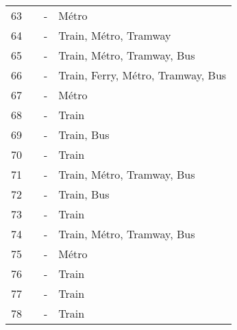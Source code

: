 \begin{longtable}{p{0.5cm}p{5.5cm}p{3cm}p{4cm}}
    \small{63} & \small{\textcite{luan_better_2020}}\index{Luan, Xin|pagebf} & \small{-} & \small{Métro}\\
    \small{64} & \small{\textcite{marques_potential_2017}}\index{Marques, R.|pagebf} & \small{-} & \small{Train, Métro, Tramway}\\
    \small{65} & \small{\textcite{martens_bicycle_2004}}\index{Martens, Karel|pagebf} & \small{-} & \small{Train, Métro, Tramway, Bus}\\
    \small{66} & \small{\textcite{martens_promoting_2007}}\index{Martens, Karel|pagebf} & \small{-} & \small{Train, Ferry, Métro, Tramway, Bus}\\
    \small{67} & \small{\textcite{meng_influence_2016}}\index{Meng, Meng|pagebf} & \small{-} & \small{Métro}\\
    \small{68} & \small{\textcite{midenet_modal_2018}}\index{Midenet, Sophie|pagebf} & \small{-} & \small{Train}\\
    \small{69} & \small{\textcite{mohanty_effect_2017}}\index{Mohanty, Sudatta|pagebf} & \small{-} & \small{Train, Bus}\\
    \small{70} & \small{\textcite{molin_bicycle_2015}}\index{Molin, Eric|pagebf} & \small{-} & \small{Train}\\
    \small{71} & \small{\textcite{molino_les_2015}}\index{Molino, Marie|pagebf} & \small{-} & \small{Train, Métro, Tramway, Bus}\\
    \small{72} & \small{\textcite{nielsen_bikeability_2018}}\index{Nielsen, Thomas Alexander Sick|pagebf} & \small{-} & \small{Train, Bus}\\
    \small{73} & \small{\textcite{nigro_land_2019}}\index{Nigro, Antonio|pagebf} & \small{-} & \small{Train}\\
    \small{74} & \small{\textcite{oostendorp_combining_2018}}\index{Oostendorp, Rebekka|pagebf} & \small{-} & \small{Train, Métro, Tramway, Bus}\\
    \small{75} & \small{\textcite{pan_intermodal_2010}}\index{Pan, Haixiao|pagebf} & \small{-} & \small{Métro}\\
    \small{76} & \small{\textcite{papon_evaluation_2017}}\index{Papon, Francis|pagebf} & \small{-} & \small{Train}\\
    \small{77} & \small{\textcite{papon_rapport_2015}}\index{Papon, Francis|pagebf} & \small{-} & \small{Train}\\
    \small{78} & \small{\textcite{park_finding_2014}}\index{Park, Sungjin|pagebf} & \small{-} & \small{Train}\\

\end{longtable}
